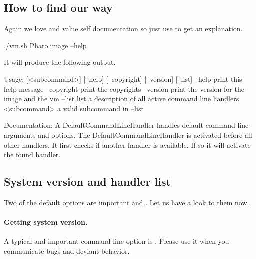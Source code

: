 \documentclass[a4paper,10pt,twoside]{book}
\begin{document}
\subsection{How to find our way}
Again we love and value self documentation so just use  to get an explanation. 

\begin{code}{}
./vm.sh Pharo.image --help
\end{code}

It will produce the following output.

\begin{code}{}
Usage: [<subcommand>] [--help] [--copyright] [--version] [--list]
	--help print this help message
	--copyright print the copyrights
	--version print the version for the image and the vm
	--list list a description of all active command line handlers
	<subcommand> a valid subcommand in --list
	
Documentation:
A DefaultCommandLineHandler handles default command line arguments and options.
The DefaultCommandLineHandler is activated before all other handlers. 
It first checks if another handler is available. If so it will activate the found handler.
\end{code}


\subsection{System version and handler list}
Two of the default options are important  and . Let us have a look to them now.



\paragraph{Getting system version.} A typical and important command line option is . Please use it when you communicate bugs and deviant behavior. 

\end{document}
